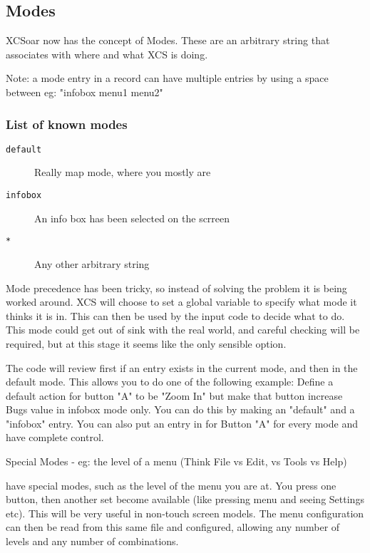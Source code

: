\subsection{Modes}

XCSoar now has the concept of Modes. These are an arbitrary
string that associates with where and what XCS is doing.

Note: a mode entry in a record can have multiple entries by using a space
between eg: "infobox menu1 menu2"

\subsubsection{List of known modes}

\begin{description}
\item[\texttt{default}] Really map mode, where you mostly are
\item[\texttt{infobox}] An info box has been selected on the scrreen
\item[\texttt{*}] Any other arbitrary string
\end{description}

Mode precedence has been tricky, so instead of solving the problem 
it is being worked around. XCS will choose to set a global variable 
to specify what mode it thinks it is in. This can then be used by the
input code to decide what to do. This mode could get out of sink
with the real world, and careful checking will be required, but at
this stage it seems like the only sensible option.

The code will review first if an entry exists in the current mode, and 
then in the default mode. This allows you to do one of the following
example: Define a default action for button "A" to be "Zoom In" but
make that button increase Bugs value in infobox mode only. You can do
this by making an "default" and a "infobox" entry. You can also put an entry
in for Button "A" for every mode and have complete control.

Special Modes - eg: the level of a menu (Think File vs Edit, vs Tools vs Help)

have special modes, such as
the level of the menu you are at. You press one button, then another
set become available (like pressing menu and seeing Settings etc). This
will be very useful in non-touch screen models. The menu configuration
can then be read from this same file and configured, allowing any
number of levels and any number of combinations.


